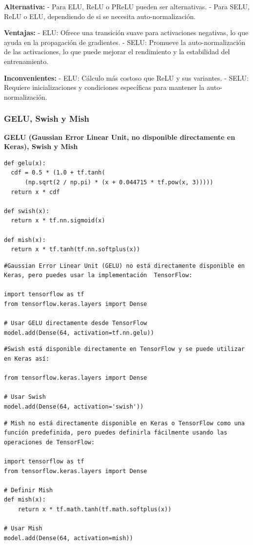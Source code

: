 \documentclass[11pt]{article}
\begin{document}
\textbf{Alternativa:} - Para ELU, ReLU o PReLU pueden ser alternativas. - Para
SELU, ReLU o ELU, dependiendo de si se necesita auto-normalización.

\textbf{Ventajas:} - ELU: Ofrece una transición suave para activaciones
negativas, lo que ayuda en la propagación de gradientes. - SELU:
Promueve la auto-normalización de las activaciones, lo que puede mejorar
el rendimiento y la estabilidad del entrenamiento.

\textbf{Inconvenientes:} - ELU: Cálculo más costoso que ReLU y sus variantes. -
SELU: Requiere inicializaciones y condiciones específicas para mantener
la auto-normalización.

\subsubsection{GELU, Swish y Mish}
\label{sec:org1166ccb}
\textbf{GELU (Gaussian Error Linear Unit, no disponible directamente en Keras),
Swish y Mish}

\begin{verbatim}
def gelu(x):
  cdf = 0.5 * (1.0 + tf.tanh(
      (np.sqrt(2 / np.pi) * (x + 0.044715 * tf.pow(x, 3)))))
  return x * cdf

def swish(x):
  return x * tf.nn.sigmoid(x)

def mish(x):
  return x * tf.tanh(tf.nn.softplus(x))
\end{verbatim}

\begin{verbatim}
#Gaussian Error Linear Unit (GELU) no está directamente disponible en Keras, pero puedes usar la implementación  TensorFlow:

import tensorflow as tf
from tensorflow.keras.layers import Dense

# Usar GELU directamente desde TensorFlow
model.add(Dense(64, activation=tf.nn.gelu))
\end{verbatim}

\begin{verbatim}
#Swish está disponible directamente en TensorFlow y se puede utilizar en Keras así:

from tensorflow.keras.layers import Dense

# Usar Swish
model.add(Dense(64, activation='swish'))
\end{verbatim}

\begin{verbatim}
# Mish no está directamente disponible en Keras o TensorFlow como una función predefinida, pero puedes definirla fácilmente usando las operaciones de TensorFlow:

import tensorflow as tf
from tensorflow.keras.layers import Dense

# Definir Mish
def mish(x):
    return x * tf.math.tanh(tf.math.softplus(x))

# Usar Mish
model.add(Dense(64, activation=mish))
\end{verbatim}
\end{document}
